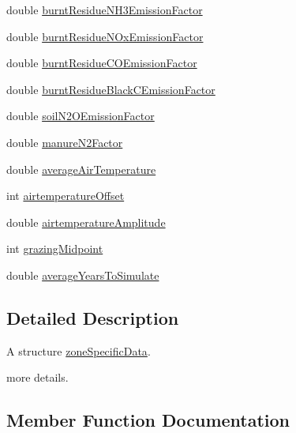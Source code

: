 \begin{DoxyCompactItemize}
\item 
double \mbox{\hyperlink{struct_global_vars_1_1zone_specific_data_ac456160e1024a462813b2ad27f8a77f0}{burnt\+Residue\+N\+H3\+Emission\+Factor}}
\item 
double \mbox{\hyperlink{struct_global_vars_1_1zone_specific_data_ae193e5a1743b42ba471967b3cca38131}{burnt\+Residue\+N\+Ox\+Emission\+Factor}}
\item 
double \mbox{\hyperlink{struct_global_vars_1_1zone_specific_data_a7666c4c83f2c45fa5f0f6d866e506d29}{burnt\+Residue\+C\+O\+Emission\+Factor}}
\item 
double \mbox{\hyperlink{struct_global_vars_1_1zone_specific_data_a995fbc1c2e1113a2735ed55b3354b04d}{burnt\+Residue\+Black\+C\+Emission\+Factor}}
\item 
double \mbox{\hyperlink{struct_global_vars_1_1zone_specific_data_a322055feec4e20fafc1bc8ba147b4982}{soil\+N2\+O\+Emission\+Factor}}
\item 
double \mbox{\hyperlink{struct_global_vars_1_1zone_specific_data_aceacb6c7ed874764debf6de75c556c24}{manure\+N2\+Factor}}
\item 
double \mbox{\hyperlink{struct_global_vars_1_1zone_specific_data_a1530185dd9893076c63b683b0c510d21}{average\+Air\+Temperature}}
\item 
int \mbox{\hyperlink{struct_global_vars_1_1zone_specific_data_a458403ecc171acb0626aa861f74bf99f}{airtemperature\+Offset}}
\item 
double \mbox{\hyperlink{struct_global_vars_1_1zone_specific_data_a79cfc4b11a43b0388af3475111fb1423}{airtemperature\+Amplitude}}
\item 
int \mbox{\hyperlink{struct_global_vars_1_1zone_specific_data_a048a804055beb52f6f9946f3f772effb}{grazing\+Midpoint}}
\item 
double \mbox{\hyperlink{struct_global_vars_1_1zone_specific_data_aa50a0df9db21a036993caeb0d1c819a0}{average\+Years\+To\+Simulate}}
\end{DoxyCompactItemize}


\subsection{Detailed Description}
A structure \mbox{\hyperlink{struct_global_vars_1_1zone_specific_data}{zone\+Specific\+Data}}. 

more details. 

\subsection{Member Function Documentation}
\mbox{\label{struct_global_vars_1_1zone_specific_data_a8ab3efd8e62fee5861270aae9d599a28}} 
